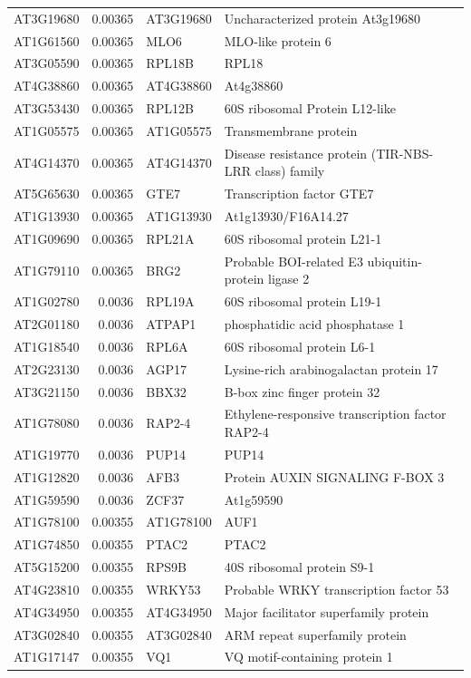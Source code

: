 \documentclass[11pt]{article}
\begin{document}
\begin{center}
\begin{tabular}{lrll}
AT3G19680 & 0.00365 & AT3G19680 & Uncharacterized protein At3g19680\\
AT1G61560 & 0.00365 & MLO6 & MLO-like protein 6\\
AT3G05590 & 0.00365 & RPL18B & RPL18\\
AT4G38860 & 0.00365 & AT4G38860 & At4g38860\\
AT3G53430 & 0.00365 & RPL12B & 60S ribosomal Protein L12-like\\
AT1G05575 & 0.00365 & AT1G05575 & Transmembrane protein\\
AT4G14370 & 0.00365 & AT4G14370 & Disease resistance protein (TIR-NBS-LRR class) family\\
AT5G65630 & 0.00365 & GTE7 & Transcription factor GTE7\\
AT1G13930 & 0.00365 & AT1G13930 & At1g13930/F16A14.27\\
AT1G09690 & 0.00365 & RPL21A & 60S ribosomal protein L21-1\\
AT1G79110 & 0.00365 & BRG2 & Probable BOI-related E3 ubiquitin-protein ligase 2\\
AT1G02780 & 0.0036 & RPL19A & 60S ribosomal protein L19-1\\
AT2G01180 & 0.0036 & ATPAP1 & phosphatidic acid phosphatase 1\\
AT1G18540 & 0.0036 & RPL6A & 60S ribosomal protein L6-1\\
AT2G23130 & 0.0036 & AGP17 & Lysine-rich arabinogalactan protein 17\\
AT3G21150 & 0.0036 & BBX32 & B-box zinc finger protein 32\\
AT1G78080 & 0.0036 & RAP2-4 & Ethylene-responsive transcription factor RAP2-4\\
AT1G19770 & 0.0036 & PUP14 & PUP14\\
AT1G12820 & 0.0036 & AFB3 & Protein AUXIN SIGNALING F-BOX 3\\
AT1G59590 & 0.0036 & ZCF37 & At1g59590\\
AT1G78100 & 0.00355 & AT1G78100 & AUF1\\
AT1G74850 & 0.00355 & PTAC2 & PTAC2\\
AT5G15200 & 0.00355 & RPS9B & 40S ribosomal protein S9-1\\
AT4G23810 & 0.00355 & WRKY53 & Probable WRKY transcription factor 53\\
AT4G34950 & 0.00355 & AT4G34950 & Major facilitator superfamily protein\\
AT3G02840 & 0.00355 & AT3G02840 & ARM repeat superfamily protein\\
AT1G17147 & 0.00355 & VQ1 & VQ motif-containing protein 1\\

\end{tabular}
\end{center}
\end{document}
